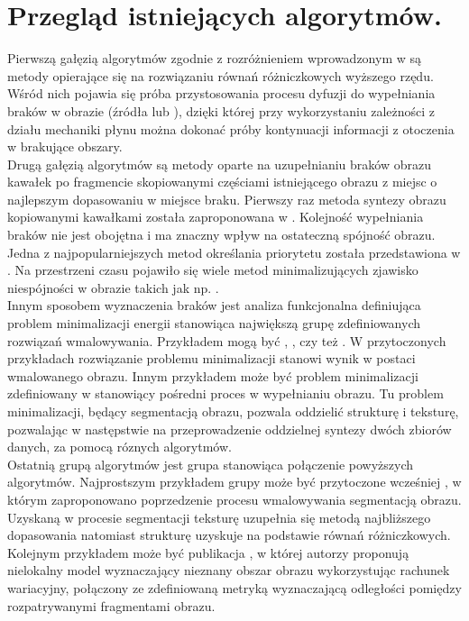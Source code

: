 \documentclass[12pt, twoside, openany]{report}
\theoremstyle{definition}
\begin{document}
\chapter{Przegląd istniejących algorytmów.}
Pierwszą gałęzią algorytmów zgodnie z rozróżnieniem wprowadzonym w  \cite{SalientStrucTexProp} są metody opierające się na rozwiązaniu równań różniczkowych wyższego rzędu. Wśród nich pojawia się próba przystosowania procesu dyfuzji do wypełniania braków w obrazie (źródła \cite{bertalmio2000image} lub \cite{BertalmioNavierStokes}), dzięki której przy wykorzystaniu zależności z działu mechaniki płynu można dokonać próby kontynuacji informacji z otoczenia w brakujące obszary. \\
Drugą gałęzią algorytmów są metody oparte na uzupełnianiu braków obrazu kawałek po fragmencie skopiowanymi częściami istniejącego obrazu z miejsc o najlepszym dopasowaniu w miejsce braku. Pierwszy raz metoda syntezy obrazu kopiowanymi kawałkami została zaproponowana w \cite{efros1999texture}. Kolejność wypełniania braków nie jest obojętna i ma znaczny wpływ na ostateczną spójność obrazu. Jedna z najpopularniejszych metod określania priorytetu została przedstawiona w \cite{criminisi2004region}. Na przestrzeni czasu pojawiło się wiele metod minimalizujących zjawisko niespójności w obrazie takich jak np. \cite{StructurePropagationManual}. \\
Innym sposobem wyznaczenia braków jest analiza funkcjonalna definiująca problem minimalizacji energii stanowiąca największą grupę zdefiniowanych rozwiązań wmalowywania. Przykładem mogą być \cite{MathematicalModelsforNLTextureInpainting}, \cite{ColorTextureInpaintingNLCTVModel}, czy też \cite{arias2011variational}. W przytoczonych przykładach rozwiązanie problemu minimalizacji stanowi wynik w postaci wmalowanego obrazu. Innym przykładem może być problem minimalizacji zdefiniowany w \cite{SalientStrucTexProp} stanowiący pośredni proces w wypełnianiu obrazu. Tu problem minimalizacji, będący segmentacją obrazu, pozwala oddzielić strukturę i teksturę, pozwalając w następstwie na przeprowadzenie oddzielnej syntezy dwóch zbiorów danych, za pomocą róznych algorytmów. \\
Ostatnią grupą algorytmów jest grupa stanowiąca połączenie powyższych algorytmów. Najprostszym przykładem grupy może być przytoczone wcześniej \cite{NavierStokesAndTexturePropagation}, w którym zaproponowano poprzedzenie procesu wmalowywania segmentacją obrazu. Uzyskaną w procesie segmentacji teksturę uzupełnia się metodą najbliższego dopasowania natomiast strukturę uzyskuje na podstawie równań różniczkowych. Kolejnym przykładem może być publikacja \cite{arias2011variational}, w której autorzy proponują nielokalny model wyznaczający nieznany obszar obrazu wykorzystując rachunek wariacyjny, połączony ze zdefiniowaną metryką wyznaczającą odległości pomiędzy rozpatrywanymi fragmentami obrazu. \\
\end{document}
